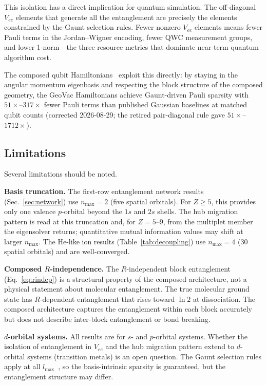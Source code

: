 \documentclass[twocolumn,pra,amsmath,amssymb,superscriptaddress]{revtex4-2}
\begin{document}
This isolation has a direct implication for
quantum simulation.  The off-diagonal $V_{ee}$ elements that
generate all the entanglement are precisely the elements constrained
by the Gaunt selection rules.  Fewer nonzero $V_{ee}$ elements
means fewer Pauli terms in the Jordan--Wigner encoding, fewer QWC
measurement groups, and lower 1-norm---the three resource metrics
that dominate near-term quantum algorithm cost.

The composed qubit Hamiltonians~\cite{GeoVac_Paper14} exploit this
directly: by staying in the angular momentum eigenbasis and
respecting the block structure of the composed geometry, the
GeoVac Hamiltonians achieve Gaunt-driven Pauli sparsity with
$51\times$--$317\times$ fewer Pauli terms than published Gaussian
baselines at matched qubit counts (corrected 2026-08-29; the retired
pair-diagonal rule gave $51\times$--$1712\times$).

\subsection{Limitations}

Several limitations should be noted.

\medskip\noindent\textbf{Basis truncation.}  The first-row
entanglement network results (Sec.~\ref{sec:network}) use
$n_{\max} = 2$ (five spatial orbitals).  For $Z \geq 5$, this
provides only one valence $p$-orbital beyond the $1s$ and $2s$
shells.  The hub migration pattern is read at this truncation and,
for $Z = 5$--$9$, from the multiplet member the eigensolver returns;
quantitative mutual information values may shift at larger
$n_{\max}$.  The He-like ion results (Table~\ref{tab:decoupling})
use $n_{\max} = 4$ (30 spatial orbitals) and are well-converged.

\medskip\noindent\textbf{Composed $R$-independence.}  The
$R$-independent block entanglement (Eq.~\ref{eq:rindep}) is a
structural property of the composed architecture, not a physical
statement about molecular entanglement.  The true molecular
ground state has $R$-dependent entanglement that rises toward
$\ln 2$ at dissociation.  The composed architecture captures the entanglement
within each block accurately but does not describe inter-block
entanglement or bond breaking.

\medskip\noindent\textbf{$d$-orbital systems.}  All results are
for $s$- and $p$-orbital systems.  Whether the isolation of
entanglement in $V_{ee}$ and the hub migration pattern extend to $d$-orbital
systems (transition metals) is an open question.  The Gaunt
selection rules apply at all $l_{\max}$~\cite{GeoVac_Paper22},
so the basis-intrinsic sparsity is guaranteed, but the
entanglement structure may differ.
\end{document}
